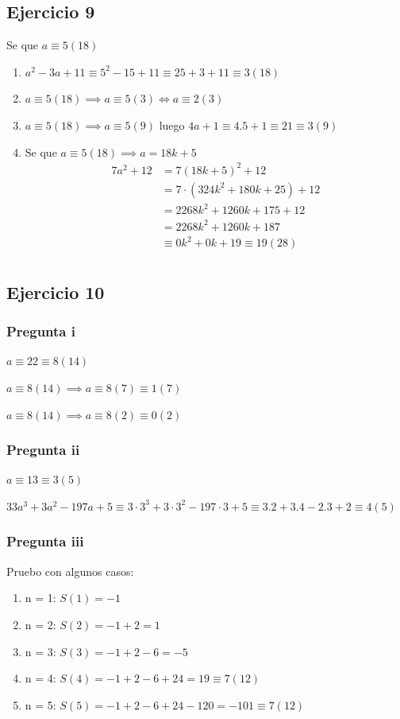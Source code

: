\subsection{Ejercicio 9}
Se que $ a \equiv 5 (18) $

\begin{enumerate}
    \item $ a^2 - 3a + 11 \equiv 5^2 - 15 + 11 \equiv 25 + 3 + 11 \equiv 3(18) $
    \item $ a\equiv 5(18) \implies a \equiv 5(3) \iff a\equiv 2(3) $
    \item $ a\equiv 5(18) \implies a \equiv 5(9) $ luego $ 4a+1 \equiv 4.5 + 1 \equiv 21 \equiv 3(9) $
    \item Se que $ a \equiv 5(18) \implies a = 18k + 5$
    \begin{align*}
        7a^2 + 12 &= 7(18k + 5)^2 + 12 \\
        &= 7\cdot (324k^2 + 180k+ 25) + 12 \\
        &= 2268k^2 + 1260k+ 175 + 12 \\
        &= 2268k^2 + 1260k+ 187 \\
        &\equiv 0k^2 + 0k+ 19 \equiv 19(28) \\
    \end{align*}
\end{enumerate}

\subsection{Ejercicio 10}
\subsubsection{Pregunta i}
$ a\equiv 22 \equiv 8(14)$

$ a\equiv 8(14) \implies a \equiv 8(7) \equiv 1(7)$

$ a\equiv 8(14) \implies a \equiv 8(2) \equiv 0(2)$

\subsubsection{Pregunta ii}
$ a \equiv 13 \equiv 3(5) $

$ 33a^3 + 3a^2 - 197a +5 \equiv 3 \cdot 3^3 + 3 \cdot 3^2 - 197 \cdot 3 + 5 \equiv 3.2 + 3.4 -2.3 + 2 \equiv 4(5) $

\subsubsection{Pregunta iii}
Pruebo con algunos casos:
\begin{enumerate}
    \item n = 1: $ S(1) = -1 $ 
    \item n = 2: $ S(2) = -1 + 2 = 1 $ 
    \item n = 3: $ S(3) = -1 + 2 -6 = -5 $ 
    \item n = 4: $ S(4) = -1 + 2 -6 + 24 = 19 \equiv 7(12) $ 
    \item n = 5: $ S(5) = -1 + 2 -6 + 24 -120 = -101 \equiv 7(12) $ 
\end{enumerate}


